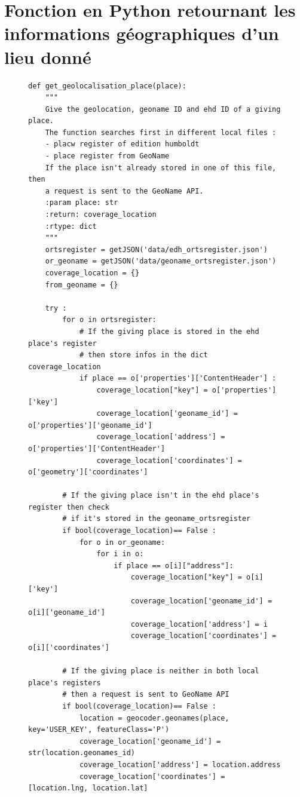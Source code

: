 \documentclass[a4paper, 12pt, twoside]{book}
\begin{document}
\chapter{Fonction en Python retournant les informations géographiques d'un lieu donné}
\label{annexe:fGeolocalisation}

\begin{figure}[h]
\begin{lstlisting}
def get_geolocalisation_place(place):
    """
    Give the geolocation, geoname ID and ehd ID of a giving place.
    The function searches first in different local files :
    - placw register of edition humboldt
    - place register from GeoName
    If the place isn't already stored in one of this file, then
    a request is sent to the GeoName API.
    :param place: str
    :return: coverage_location
    :rtype: dict
    """
    ortsregister = getJSON('data/edh_ortsregister.json')
    or_geoname = getJSON('data/geoname_ortsregister.json')
    coverage_location = {}
    from_geoname = {}
    
    try :
        for o in ortsregister:
            # If the giving place is stored in the ehd place's register
            # then store infos in the dict coverage_location
            if place == o['properties']['ContentHeader'] :
                coverage_location["key"] = o['properties']['key']
                coverage_location['geoname_id'] = o['properties']['geoname_id']
                coverage_location['address'] = o['properties']['ContentHeader']
                coverage_location['coordinates'] = o['geometry']['coordinates']
    
        # If the giving place isn't in the ehd place's register then check
        # if it's stored in the geoname_ortsregister
        if bool(coverage_location)== False :
            for o in or_geoname:
                for i in o:
                    if place == o[i]["address"]:
                        coverage_location["key"] = o[i]['key']
                        coverage_location['geoname_id'] = o[i]['geoname_id']
                        coverage_location['address'] = i
                        coverage_location['coordinates'] = o[i]['coordinates']

        # If the giving place is neither in both local place's registers
        # then a request is sent to GeoName API      
        if bool(coverage_location)== False :
            location = geocoder.geonames(place, key='USER_KEY', featureClass='P')
            coverage_location['geoname_id'] = str(location.geonames_id)
            coverage_location['address'] = location.address
            coverage_location['coordinates'] = [location.lng, location.lat]
        

\end{lstlisting}
\end{figure}
\end{document}
